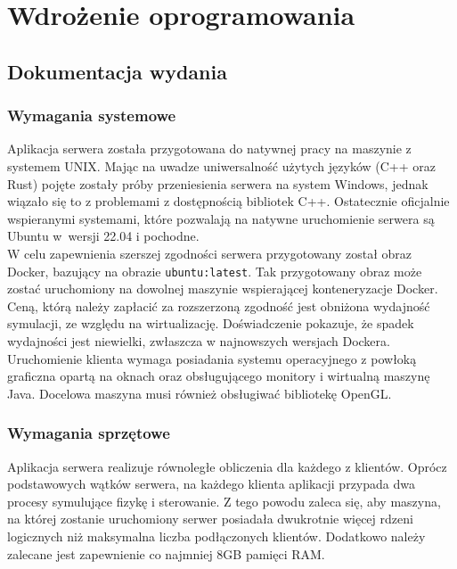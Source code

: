 \chapter{Wdrożenie oprogramowania} \label{wzdrozenie}
\section{Dokumentacja wydania}
\subsection{Wymagania systemowe}
Aplikacja serwera została przygotowana do natywnej pracy na maszynie z systemem UNIX. Mając na uwadze uniwersalność użytych języków (C++ oraz Rust) pojęte zostały próby przeniesienia serwera na system Windows, jednak wiązało się to z problemami z dostępnością bibliotek C++. Ostatecznie oficjalnie wspieranymi systemami, które pozwalają na natywne uruchomienie serwera są Ubuntu w~wersji 22.04 i pochodne. \\

W celu zapewnienia szerszej zgodności serwera przygotowany został obraz Docker, bazujący na obrazie \texttt{ubuntu:latest}. Tak przygotowany obraz może zostać uruchomiony na dowolnej maszynie wspierającej konteneryzacje Docker. Ceną, którą należy zapłacić za rozszerzoną zgodność jest obniżona wydajność symulacji, ze względu na wirtualizację. Doświadczenie pokazuje, że spadek wydajności jest niewielki, zwłaszcza w najnowszych wersjach Dockera.\\

 Uruchomienie klienta wymaga posiadania systemu operacyjnego z powłoką graficzna opartą na oknach oraz obsługującego monitory i wirtualną maszynę Java. Docelowa maszyna musi również obsługiwać bibliotekę OpenGL.


\subsection{Wymagania sprzętowe}

Aplikacja serwera realizuje równoległe obliczenia dla każdego z klientów. Oprócz podstawowych wątków serwera, na każdego klienta aplikacji przypada dwa procesy symulujące fizykę i sterowanie. Z tego powodu zaleca się, aby maszyna, na której zostanie uruchomiony serwer posiadała dwukrotnie więcej rdzeni logicznych niż maksymalna liczba podłączonych klientów. Dodatkowo należy zalecane jest zapewnienie co najmniej 8GB pamięci RAM. \\

